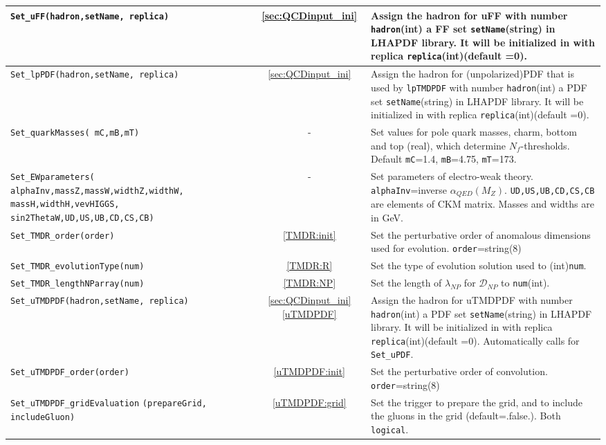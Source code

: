 \documentclass[prd,nofootinbib,eqsecnum,final]{revtex4}
\renewcommand{\(}{\left(}
\renewcommand{\)}{\right)}
\renewcommand{\[}{\left[}
\renewcommand{\]}{\right]}
\newcommand{\blue}[1]{{\color{blue} #1}}
\begin{document}
\begin{center}
\begin{longtable}{||p{7cm}|c|p{10cm}||}
\\\hline
\texttt{Set\_uFF(hadron,setName,\blue{replica}) } & \ref{sec:QCDinput_ini} & Assign the hadron for uFF with number \texttt{hadron}(int) a FF set \texttt{setName}(string) in LHAPDF library. It will be initialized in with replica \texttt{replica}(int)(default =0).
\\\hline
\texttt{Set\_lpPDF(hadron,setName,\blue{replica}) } & \ref{sec:QCDinput_ini} & Assign the hadron for (unpolarized)PDF that is used by \texttt{lpTMDPDF} with number \texttt{hadron}(int) a PDF set \texttt{setName}(string) in LHAPDF library. It will be initialized in with replica \texttt{replica}(int)(default =0).
\\\hline
\texttt{Set\_quarkMasses(\blue{mC,mB,mT})} & - & Set values for pole quark masses, charm, bottom and top (real), which determine $N_f$-thresholds. Default \texttt{mC}=1.4, \texttt{mB}=4.75, \texttt{mT}=173.
\\\hline \texttt{Set\_EWparameters(}\texttt{
\blue{alphaInv,massZ,massW,widthZ,widthW,}} \texttt{\blue{massH,widthH,vevHIGGS,}} \texttt{\blue{sin2ThetaW,UD,US,UB,CD,CS,CB)}} & - & Set parameters of electro-weak theory. \texttt{alphaInv}=inverse $\alpha_{QED}(M_Z)$. \texttt{UD,US,UB,CD,CS,CB} are elements of CKM matrix. Masses and widths are in GeV.
\\\hline\hline
\texttt{Set\_TMDR\_order(order)} & \ref{TMDR:init} & Set the perturbative order of anomalous dimensions used for evolution. \texttt{order}=string(8)
\\\hline
\texttt{Set\_TMDR\_evolutionType(num)} & \ref{TMDR:R} & Set the type of evolution solution used to (int)\texttt{num}.
\\\hline
\texttt{Set\_TMDR\_lengthNParray(num)} & \ref{TMDR:NP} & Set the length of $\lambda_{NP}$ for $\mathcal{D}_{NP}$ to \texttt{num}(int).
\\\hline\hline
\texttt{Set\_uTMDPDF(hadron,setName,\blue{replica}) } & \ref{sec:QCDinput_ini} \ref{uTMDPDF} & Assign the hadron for uTMDPDF with number \texttt{hadron}(int) a PDF set \texttt{setName}(string) in LHAPDF library. It will be initialized in with replica \texttt{replica}(int)(default =0). Automatically calls for \texttt{Set\_uPDF}.
\\\hline
\texttt{Set\_uTMDPDF\_order(order)} &\ref{uTMDPDF:init} & Set the perturbative order of convolution. \texttt{order}=string(8)
\\\hline
\texttt{Set\_uTMDPDF\_gridEvaluation} \texttt{(prepareGrid,\blue{includeGluon})} & \ref{uTMDPDF:grid} & Set the trigger to prepare the grid, and to include the gluons in the grid (default=.false.). Both \texttt{logical}.

\end{longtable}
\end{center}
\end{document}
